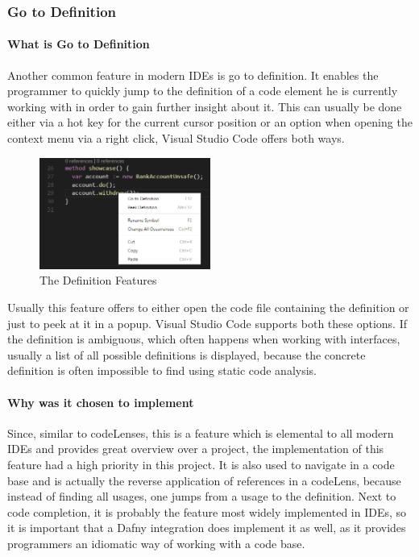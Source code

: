 \subsubsection{Go to Definition} \label{aggotodefinition}
\paragraph{What is Go to Definition}
Another common feature in modern IDEs is go to definition. It enables the programmer to quickly jump to the definition of a code element he is currently working with in order to gain further insight about it. This can usually be done either via a hot key for the current cursor position or an option when opening the context menu via a right click, Visual Studio Code offers both ways.\newline
\begin{figure}[H]
	\centering
	\includegraphics[width=0.5\textwidth]{img/goToDefinition}
	\caption{The Definition Features}
	\label{fig:aggotodefinition}
\end{figure}
Usually this feature offers to either open the code file containing the definition or just to peek at it in a popup. Visual Studio Code supports both these options. If the definition is ambiguous, which often happens when working with interfaces, usually a list of all possible definitions is displayed, because the concrete definition is often impossible to find using static code analysis.
\paragraph{Why was it chosen to implement}
Since, similar to codeLenses, this is a feature which is elemental to all modern IDEs and provides great overview over a project, the implementation of this feature had a high priority in this project. It is also used to navigate in a code base and is actually the reverse application of references in a codeLens, because instead of finding all usages, one jumps from a usage to the definition. \newline
Next to code completion, it is probably the feature most widely implemented in IDEs, so it is important that a Dafny integration does implement it as well, as it provides programmers an idiomatic way of working with a code base.

